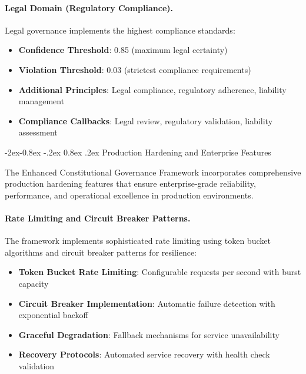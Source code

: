 \documentclass[manuscript,screen,9pt]{acmart}
\makeatletter
\renewcommand\subsubsection{\@startsection{subsubsection}{3}{\z@}%
  {-2ex\@plus -0.8ex \@minus -.2ex}%
  {0.8ex \@plus .2ex}%
  {\normalfont\normalsize\bfseries}}
\makeatother
\begin{document}
\paragraph{Legal Domain (Regulatory Compliance).}
Legal governance implements the highest compliance standards:
\begin{itemize}[itemsep=1pt,parsep=1pt]
    \item \textbf{Confidence Threshold}: 0.85 (maximum legal certainty)
    \item \textbf{Violation Threshold}: 0.03 (strictest compliance requirements)
    \item \textbf{Additional Principles}: Legal compliance, regulatory adherence, liability management
    \item \textbf{Compliance Callbacks}: Legal review, regulatory validation, liability assessment
\end{itemize}

\subsubsection{Production Hardening and Enterprise Features}
\label{subsubsec:production_hardening}

The Enhanced Constitutional Governance Framework incorporates comprehensive production hardening features that ensure enterprise-grade reliability, performance, and operational excellence in production environments.

\paragraph{Rate Limiting and Circuit Breaker Patterns.}
The framework implements sophisticated rate limiting using token bucket algorithms and circuit breaker patterns for resilience:

\begin{itemize}[itemsep=1pt,parsep=1pt]
    \item \textbf{Token Bucket Rate Limiting}: Configurable requests per second with burst capacity
    \item \textbf{Circuit Breaker Implementation}: Automatic failure detection with exponential backoff
    \item \textbf{Graceful Degradation}: Fallback mechanisms for service unavailability
    \item \textbf{Recovery Protocols}: Automated service recovery with health check validation
\end{itemize}
\end{document}
